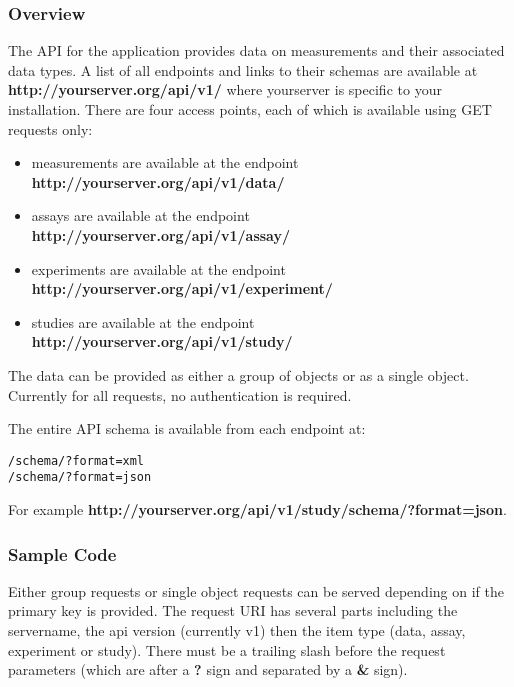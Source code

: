 \documentclass[letterpaper,10pt,english]{sphinxmanual}
\begin{document}
\subsubsection{Overview}
\label{data:overview}
The API for the  application provides data on measurements and their associated data types.
A list of all endpoints and links to their schemas are available at \textbf{http://yourserver.org/api/v1/} where yourserver is specific to your installation.
There are four access points, each of which is available using GET requests only:
\begin{itemize}
\item {} 
measurements are available at the endpoint \textbf{http://yourserver.org/api/v1/data/}

\item {} 
assays are available at the endpoint \textbf{http://yourserver.org/api/v1/assay/}

\item {} 
experiments are available at the endpoint \textbf{http://yourserver.org/api/v1/experiment/}

\item {} 
studies are available at the endpoint \textbf{http://yourserver.org/api/v1/study/}

\end{itemize}

The data can be provided as either a group of objects or as a single object. 
Currently for all requests, no authentication is required.

The entire API schema is available from each endpoint at:

\begin{Verbatim}[commandchars=\\\{\}]
/schema/?format=xml
/schema/?format=json
\end{Verbatim}

For example \textbf{http://yourserver.org/api/v1/study/schema/?format=json}.


\subsubsection{Sample Code}
\label{data:sample-code}
Either group requests or single object requests can be served depending on if the primary key is provided.  
The request URI has several parts including the servername, the api version (currently v1) then the item type (data, assay, experiment or study).  
There must be a trailing slash before the request parameters (which are after a \textbf{?} sign and separated by a \textbf{\&} sign).
\end{document}
